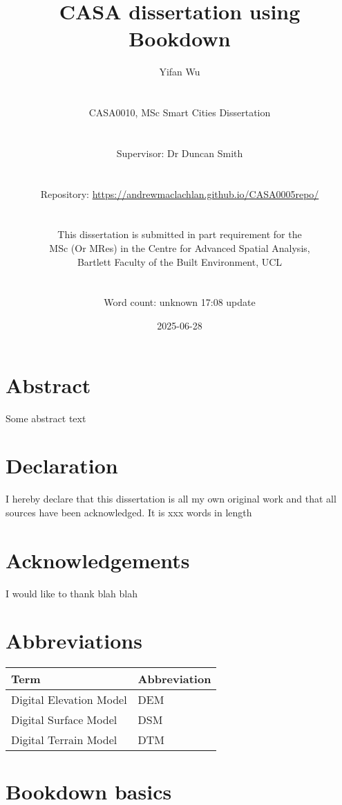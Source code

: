 \documentclass[
  12pt,
  oneside]{book}
\title{CASA dissertation using Bookdown}
\author{Yifan Wu\\
\strut \\
CASA0010, MSc Smart Cities Dissertation\\
\strut \\
Supervisor: Dr Duncan Smith\\
\strut \\
Repository: \url{https://andrewmaclachlan.github.io/CASA0005repo/}\\
\strut \\
This dissertation is submitted in part requirement for the\\
MSc (Or MRes) in the Centre for Advanced Spatial Analysis,\\
Bartlett Faculty of the Built Environment, UCL\\
\strut \\
Word count: unknown 17:08 update}
\date{2025-06-28}
\begin{document}
\maketitle


\chapter*{Abstract}\label{abstract}

Some abstract text


\chapter*{Declaration}\label{declaration}

I hereby declare that this dissertation is all my own original work and that all sources have been acknowledged. It is xxx words in length

\chapter*{Acknowledgements}\label{acknowledgements}

I would like to thank blah blah

\setcounter{tocdepth}{3}
\tableofcontents
\listoffigures
\listoftables

\chapter*{Abbreviations}\label{abbreviations}

\begin{table}
\centering
\begin{tabular}{ll}
\toprule
\textbf{Term} & \textbf{Abbreviation}\\
\midrule
Digital Elevation Model & DEM\\
Digital Surface Model & DSM\\
Digital Terrain Model & DTM\\
\bottomrule
\end{tabular}
\end{table}

\chapter{Bookdown basics}\label{bookdown-basics}
\end{document}

